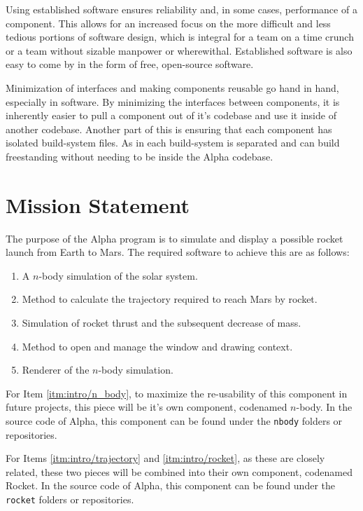 Using established software ensures reliability and, in some cases, performance
of a component. This allows for an increased focus on the more difficult and
less tedious portions of software design, which is integral for a team on a time
crunch or a team without sizable manpower or wherewithal. Established software
is also easy to come by in the form of free, open-source software.

Minimization of interfaces and making components reusable go hand in hand,
especially in software. By minimizing the interfaces between components, it is
inherently easier to pull a component out of it's codebase and use it inside of
another codebase. Another part of this is ensuring that each component has
isolated build-system files. As in each build-system is separated and can build
freestanding without needing to be inside the Alpha codebase.

\section{Mission Statement}

The purpose of the Alpha program is to simulate and display a possible rocket
launch from Earth to Mars. The required software to achieve this are as follows:

\begin{enumerate}
    \item \label{itm:intro/n_body} A $n$-body simulation of the solar system.
    \item \label{itm:intro/trajectory} Method to calculate the trajectory required to reach Mars by rocket.
    \item \label{itm:intro/rocket} Simulation of rocket thrust and the subsequent decrease of mass.
    \item \label{itm:intro/window} Method to open and manage the window and drawing context.
    \item \label{itm:intro/renderer} Renderer of the $n$-body simulation.
\end{enumerate}

For Item \ref{itm:intro/n_body}, to maximize the re-usability of this component
in future projects, this piece will be it's own component, codenamed $n$-body.
In the source code of Alpha, this component can be found under the
\texttt{nbody} folders or repositories.

For Items \ref{itm:intro/trajectory} and \ref{itm:intro/rocket}, as these are
closely related, these two pieces will be combined into their own component,
codenamed Rocket. In the source code of Alpha, this component can be found under
the \texttt{rocket} folders or repositories.

